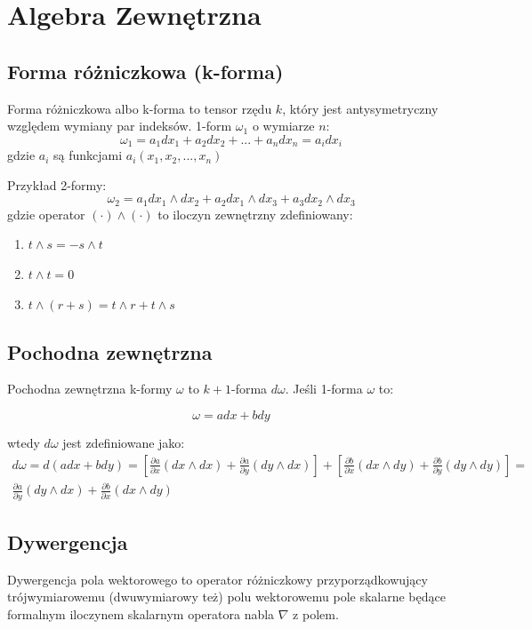 \documentclass[12pt]{article}
\begin{document}
\section{Algebra Zewnętrzna}

\subsection{Forma różniczkowa (k-forma)}
Forma różniczkowa albo k-forma to tensor rzędu $k$, który jest antysymetryczny względem wymiany par indeksów. 1-form $\omega_{1}$ o wymiarze $n$:
\begin{equation}
\omega_{1} = a_{1} dx_{1} + a_{2} dx_{2} + ... + a_{n} dx_{n} = a_{i} dx_{i}
\end{equation}
gdzie $a_{i}$ są funkcjami $a_{i}(x_{1}, x_{2}, ..., x_{n})$

Przykład 2-formy:
\begin{equation}
\omega_{2} = a_{1} dx_{1} \wedge dx_{2} + a_{2} dx_{1} \wedge dx_{3} + a_{3} dx_{2} \wedge dx_{3}
\end{equation}
gdzie operator $(\cdot) \wedge (\cdot)$ to iloczyn zewnętrzny zdefiniowany:
\begin{enumerate}
\item $t \wedge s = - s \wedge t$
\item $t \wedge t = 0$
\item $t \wedge (r + s) = t \wedge r + t \wedge s$
\end{enumerate}

\subsection{Pochodna zewnętrzna}
Pochodna zewnętrzna k-formy $\omega$ to $k+1$-forma $d \omega$.
Jeśli 1-forma $\omega$ to:

\begin{equation}
\omega = a dx + b dy
\end{equation}

wtedy $d \omega$ jest zdefiniowane jako:
\begin{align*}
d \omega = d(a dx + b dy) = [\frac{\partial a}{\partial x} (dx \wedge dx) + \frac{\partial a}{\partial y} (dy \wedge dx)] + [\frac{\partial b}{\partial x} (dx \wedge dy) + \frac{\partial b}{\partial y} (dy \wedge dy)] =
\\
\frac{\partial a}{\partial y} (dy \wedge dx) + \frac{\partial b}{\partial x} (dx \wedge dy)
\end{align*}

\subsection{Dywergencja}
Dywergencja pola wektorowego to operator różniczkowy przyporządkowujący trójwymiarowemu (dwuwymiarowy też) polu wektorowemu pole skalarne będące formalnym iloczynem skalarnym operatora nabla $\nabla$ z polem. 
\end{document}

